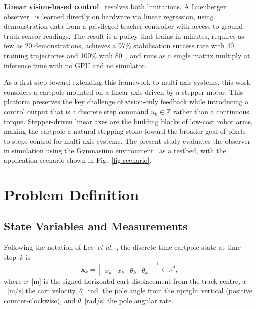 \documentclass[conference]{IEEEtran}
\newcommand{\bx}{\bm{x}}
\newcommand{\R}{\mathbb{R}}
\begin{document}
\textbf{Linear vision-based control}~\cite{lee2024} resolves both limitations.
A Luenberger observer~\cite{luenberger1964} is learned directly on hardware via
linear regression, using demonstration data from a privileged teacher controller
with access to ground-truth sensor readings.  The result is a policy that trains
in minutes, requires as few as 20 demonstrations, achieves a 97\% stabilisation
success rate with 40 training trajectories and 100\% with 80~\cite{lee2024}, and
runs as a single matrix multiply at inference time with no GPU and no simulator.

As a first step toward extending this framework to multi-axis systems, this work
considers a cartpole mounted on a linear axis driven by a stepper motor.  This
platform preserves the key challenge of vision-only feedback while introducing a
control output that is a discrete step command $u_k\in\mathbb{Z}$ rather than a
continuous torque.  Stepper-driven linear axes are the building blocks of
low-cost robot arms, making the cartpole a natural stepping stone toward the
broader goal of pixels-to-steps control for multi-axis systems.  The present
study evaluates the observer in simulation using the Gymnasium
environment~\cite{brockman2016openai} as a testbed, with the application
scenario shown in Fig.~\ref{fig:scenario}.

\section{Problem Definition}
\label{sec:problem}

\subsection{State Variables and Measurements}

Following the notation of Lee~\emph{et al.}~\cite{lee2024}, the discrete-time
cartpole state at time step~$k$ is
\begin{equation}
  \bx_k = \begin{bmatrix}
    x_k & \dot{x}_k & \theta_k & \dot{\theta}_k
  \end{bmatrix}^\top \in \R^4,
  \label{eq:state}
\end{equation}
where $x$~[m] is the signed horizontal cart displacement from the track
centre, $\dot{x}$~[m/s] the cart velocity, $\theta$~[rad] the pole angle
from the upright vertical (positive counter-clockwise), and
$\dot{\theta}$~[rad/s] the pole angular rate.
\end{document}
